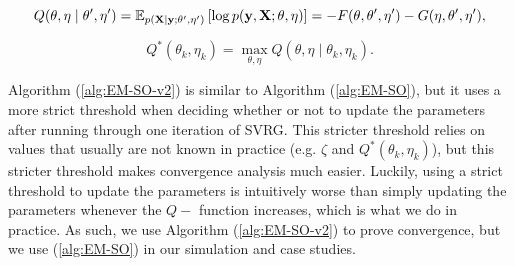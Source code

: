 $$Q(\theta,\eta \mid \theta',\eta') = \mathbb{E}_{p(\mathbf{X} \mid \mathbf{y};\theta',\eta')}\left[\log p(\mathbf{y},\mathbf{X};\theta,\eta) \right] = - F(\theta,\theta',\eta') - G(\eta,\theta',\eta'),$$
    
$$Q^*(\theta_k,\eta_k) = \max_{\theta,\eta} Q(\theta,\eta \mid \theta_k,\eta_k).$$

Algorithm (\ref{alg:EM-SO-v2}) is similar to Algorithm (\ref{alg:EM-SO}), but it uses a more strict threshold when deciding whether or not to update the parameters after running through one iteration of SVRG. This stricter threshold relies on values that usually are not known in practice (e.g. $\zeta$ and $Q^*(\theta_k,\eta_k)$), but this stricter threshold makes convergence analysis much easier. Luckily, using a strict threshold to update the parameters is intuitively worse than simply updating the parameters whenever the $Q-$ function increases, which is what we do in practice. As such, we use Algorithm (\ref{alg:EM-SO-v2}) to prove convergence, but we use (\ref{alg:EM-SO}) in our simulation and case studies.


